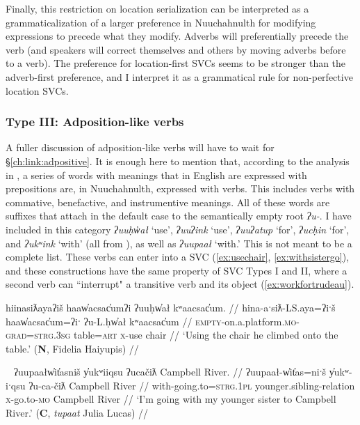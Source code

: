 Finally, this restriction on location serialization can be interpreted as a grammaticalization of a larger preference in Nuuchahnulth for modifying expressions to precede what they modify. Adverbs will preferentially precede the verb (and speakers will correct themselves and others by moving adverbs before to a verb). The preference for location-first SVCs seems to be stronger than the adverb-first preference, and I interpret it as a grammatical rule for non-perfective location SVCs.

\vspace{10pt}

\subsubsection{Type III: Adposition-like verbs} \label{ch:sv:data:type3}

\vspace{10pt}

A fuller discussion of adposition-like verbs will have to wait for \S\ref{ch:link:adpositive}. It is enough here to mention that, according to the analysis in \citep{woo2007b}, a series of words with meanings that in English are expressed with prepositions are, in Nuuchahnulth, expressed with verbs. This includes verbs with commative, benefactive, and instrumentive meanings. All of these words are suffixes that attach in the default case to the semantically empty root \textit{ʔu-}. I have included in this category \textit{ʔuuḥw̓ał} `use', \textit{ʔuuʔink} `use', \textit{ʔuuʔatup} `for', \textit{ʔucḥin} `for', and \textit{ʔukʷink} `with' (all from \citealt[p.15]{woo2007b}), as well as \textit{ʔuupaał} `with.' This is not meant to be a complete list. These verbs can enter into a SVC  (\ref{ex:usechair}, \ref{ex:withsistergo}), and these constructions have the same property of SVC Types I and II, where a second verb can ``interrupt" a transitive verb and its object (\ref{ex:workfortrudeau}).


\ex \label{ex:usechair}
\begingl
\glpreamble hiinasiƛayaʔiš haaw̓acsac̓umʔi ʔuuḥw̓ał kʷaacsac̓um. //
\gla hina-aˑsiƛ-LS.aya=ʔiˑš haaw̓acsac̓um=ʔiˑ ʔu-L.ḥw̓ał kʷaacsac̓um //
\glb \textsc{empty}-on.a.platform.\textsc{mo}-\textsc{grad}=\textsc{strg.3sg} table=\textsc{art} \textsc{x}-use chair //
\glft `Using the chair he climbed onto the table.' (\textbf{N}, Fidelia Haiyupis) //
\endgl
\xe

\ex~ \label{ex:withsistergo}
\begingl
\glpreamble ʔuupaałw̓it̓asniš y̓ukʷiiqsu ʔucačiƛ Campbell River. //
\gla ʔuupaał-w̓it̓as=niˑš y̓ukʷ-iˑqsu ʔu-ca-čiƛ Campbell River //
\glb with-going.to=\textsc{strg.1pl} younger.sibling-relation \textsc{x}-go.to-\textsc{mo} Campbell River //
\glft `I'm going with my younger sister to Campbell River.' (\textbf{C}, \textit{tupaat} Julia Lucas) //
\endgl
\xe


